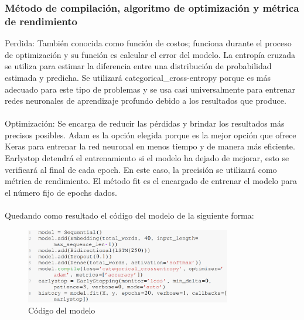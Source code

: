 \subsubsection{Método de compilación, algoritmo de optimización y métrica de rendimiento}
Perdida: También conocida como función de costos; funciona durante el proceso de optimización y su función es calcular el error del modelo. La entropía cruzada se utiliza para estimar la diferencia entre una distribución de probabilidad estimada y predicha. Se utilizará categorical\_cross-entropy porque es más adecuado para este tipo de problemas y se usa casi universalmente para entrenar redes neuronales de aprendizaje profundo debido a los resultados que produce.\\\\
Optimización: Se encarga de reducir las pérdidas y brindar los resultados más precisos posibles. Adam es la opción elegida porque es la mejor opción que ofrece Keras para entrenar la red neuronal en menos tiempo y de manera más eficiente. Earlystop detendrá el entrenamiento si el modelo ha dejado de mejorar, esto se verificará al final de cada epoch. En este caso, la precisión se utilizará como métrica de rendimiento.
El método fit es el encargado de entrenar el modelo para el número fijo de epochs dados.\\\\
Quedando como resultado el código del modelo de la siguiente forma:
\begin{figure}[h]
	\centering
	\includegraphics[width=9cm]{figuras/Modelo.png}
	\caption{Código del modelo}
	\label{fig:Código del modelo}
\end{figure}
